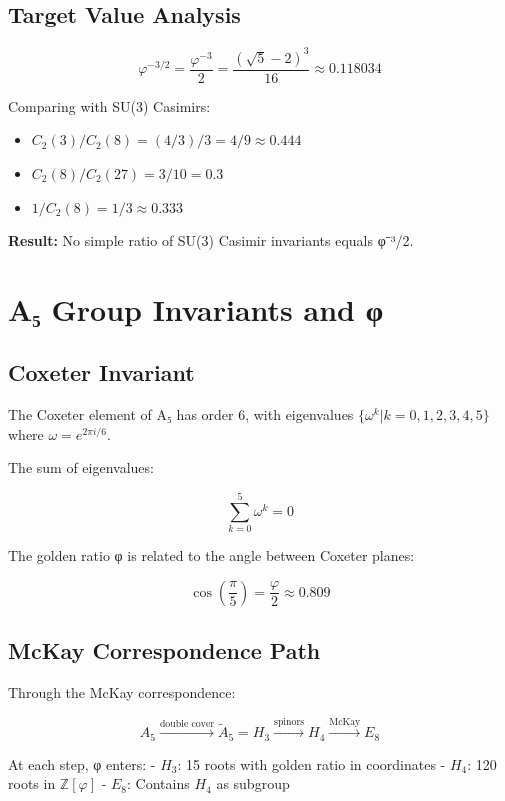 \documentclass{article}
\begin{document}
\subsection{Target Value Analysis}

\[
\varphi^{-3/2} = \frac{\varphi^{-3}}{2} = \frac{(\sqrt{5} - 2)^3}{16} \approx 0.118034
\]

Comparing with SU(3) Casimirs:

\begin{itemize}
\item $C_2(3) / C_2(8) = (4/3) / 3 = 4/9 \approx 0.444$
\item $C_2(8) / C_2(27) = 3 / 10 = 0.3$
\item $1/C_2(8) = 1/3 \approx 0.333$
\end{itemize}

\textbf{Result:} No simple ratio of SU(3) Casimir invariants equals φ⁻³/2.

\section{A₅ Group Invariants and φ}

\subsection{Coxeter Invariant}

The Coxeter element of A₅ has order 6, with eigenvalues $\{\omega^k | k = 0, 1, 2, 3, 4, 5\}$ where $\omega = e^{2\pi i/6}$.

The sum of eigenvalues:

\[
\sum_{k=0}^5 \omega^k = 0
\]

The golden ratio φ is related to the angle between Coxeter planes:

\[
\cos\left(\frac{\pi}{5}\right) = \frac{\varphi}{2} \approx 0.809
\]

\subsection{McKay Correspondence Path}

Through the McKay correspondence:

\[
A_5 \xrightarrow{\text{double cover}} \tilde{A}_5 = H_3 \xrightarrow{\text{spinors}} H_4 \xrightarrow{\text{McKay}} E_8
\]

At each step, φ enters:
- $H_3$: 15 roots with golden ratio in coordinates
- $H_4$: 120 roots in $\mathbb{Z}[\varphi]$
- $E_8$: Contains $H_4$ as subgroup
\end{document}

